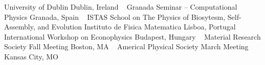     University of Dublin
    \newline
Dublin, Ireland
\newline
~
\Gap
{}
Granada Seminar --  Computational Physics
\newline
Granada, Spain
\newline
~
\Gap
{}
ISTAS School on The Physics of Biosytesm, Self-Assembly, and Evolution
\newline
    Instituto de Fisica Matematica
    \newline
Lisboa, Portugal
\newline
~
\Gap
{}
International Workshop on Econophysics
\newline
Budapest, Hungary
\newline
~
\Gap
{}
Material Research Society Fall Meeting
\newline
Boston, MA
\newline
~
\Gap
{}
Americal Physical Society March Meeting
\newline
Kansas City, MO
\newline
~
\Gap
\vspace*{0.2cm}